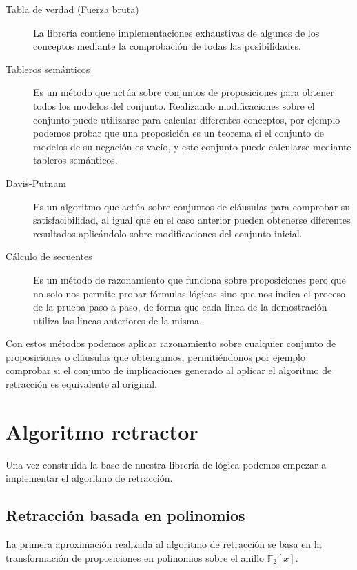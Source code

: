	\begin{description}
		\item[Tabla de verdad (Fuerza bruta)] La librería contiene implementaciones exhaustivas de algunos de los conceptos mediante la comprobación de todas las posibilidades.
		\item[Tableros semánticos] Es un método que actúa sobre conjuntos de proposiciones para obtener todos los modelos del conjunto. Realizando modificaciones sobre el conjunto puede utilizarse para calcular diferentes conceptos, por ejemplo podemos probar que una proposición es un teorema si el conjunto de modelos de su negación es vacío, y este conjunto puede calcularse mediante tableros semánticos. 
		
		\item[Davis-Putnam] Es un algoritmo que actúa sobre conjuntos de cláusulas para comprobar su satisfacibilidad, al igual que en el caso anterior pueden obtenerse diferentes resultados aplicándolo sobre modificaciones del conjunto inicial.
		\item[Cálculo de secuentes] Es un método de razonamiento que funciona sobre proposiciones pero que no solo nos permite probar fórmulas lógicas sino que nos indica el proceso de la prueba paso a paso, de forma que cada linea de la demostración utiliza las lineas anteriores de la misma.
	\end{description}

	Con estos métodos podemos aplicar razonamiento sobre cualquier conjunto de proposiciones o cláusulas que obtengamos, permitiéndonos por ejemplo comprobar si el conjunto de implicaciones generado al aplicar el algoritmo de retracción es equivalente al original.
	
	
\section*{Algoritmo retractor}	
	
	Una vez construida la base de nuestra librería de lógica podemos empezar a implementar el algoritmo de retracción.
	
\subsection*{Retracción basada en polinomios}

	La primera aproximación realizada al algoritmo de retracción se basa en la transformación de proposiciones en polinomios sobre el anillo $\mathbb{F}_2[x]$. 

